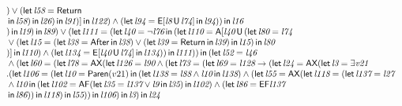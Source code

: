 \documentclass{article}
\newcommand{\U}{\,\mbox{\sf{U}}\,}
\newcommand{\A}{\mbox{\sf{A}}}
\newcommand{\E}{\mbox{\sf{E}}}
\newcommand{\AX}{\mbox{\sf{AX}}}
\newcommand{\AF}{\mbox{\sf{AF}}}
\newcommand{\EF}{\mbox{\sf{EF}}}
\newcommand{\mita}[1]{\mbox{\it{{#1}}}}
\newcommand{\msf}[1]{\mbox{\sf{{#1}}}}
\begin{document}
\[\begin{array}{l}
) \vee (\mita{\sf{let}} \, \mita{l58} = \msf{Return}\\\mbox{} \, \mita{\sf{in}} \, \mita{l58}
) \, \mita{\sf{in}} \, \mita{l26}
) \, \mita{\sf{in}} \, \mita{l91}
)]
 \, \mita{\sf{in}} \, \mita{l122}
) \wedge (\mita{\sf{let}} \, \mita{l94} = \E[\mita{l8} \U \mita{l74}]
 \, \mita{\sf{in}} \, \mita{l94}
)
) \, \mita{\sf{in}} \, \mita{l16}\\\mbox{}
) \, \mita{\sf{in}} \, \mita{l19}
) \, \mita{\sf{in}} \, \mita{l89}
) \vee (\mita{\sf{let}} \, \mita{l111} = (\mita{\sf{let}} \, \mita{l40} = \neg \mita{l76} \, \mita{\sf{in}} \, (\mita{\sf{let}} \, \mita{l110} = \A[\mita{l40} \U (\mita{\sf{let}} \, \mita{l80} = \mita{l74}\\\mbox{} \vee (\mita{\sf{let}} \, \mita{l15} = (\mita{\sf{let}} \, \mita{l38} = \msf{After} \, \mita{\sf{in}} \, \mita{l38}
) \vee (\mita{\sf{let}} \, \mita{l39} = \msf{Return} \, \mita{\sf{in}} \, \mita{l39}
) \, \mita{\sf{in}} \, \mita{l15}
) \, \mita{\sf{in}} \, \mita{l80}\\\mbox{}
)]
 \, \mita{\sf{in}} \, \mita{l110}
) \wedge (\mita{\sf{let}} \, \mita{l134} = \E[\mita{l40} \U \mita{l74}]
 \, \mita{\sf{in}} \, \mita{l134}
)
) \, \mita{\sf{in}} \, \mita{l111}
)
) \, \mita{\sf{in}} \, (\mita{\sf{let}} \, \mita{l52} = \mita{l46}\\\mbox{} \wedge (\mita{\sf{let}} \, \mita{l60} = (\mita{\sf{let}} \, \mita{l78} = \AX(\mita{\sf{let}} \, \mita{l126} = \mita{l90} \wedge (\mita{\sf{let}} \, \mita{l73} = (\mita{\sf{let}} \, \mita{l69} = \mita{l128} \rightarrow (\mita{\sf{let}} \, \mita{l24} = \AX(\mita{\sf{let}} \, \mita{l3} = \exists \mita{v21}\\\mbox{} . (\mita{\sf{let}} \, \mita{l106} = (\mita{\sf{let}} \, \mita{l10} = \msf{Paren}(v21) \, \mita{\sf{in}} \, (\mita{\sf{let}} \, \mita{l138} = \mita{l88} \wedge \mita{l10} \, \mita{\sf{in}} \, \mita{l138}
) \wedge (\mita{\sf{let}} \, \mita{l55} = \AX(\mita{\sf{let}} \, \mita{l118} = (\mita{\sf{let}} \, \mita{l137} = \mita{l27}\\\mbox{} \wedge \mita{l10} \, \mita{\sf{in}} \, (\mita{\sf{let}} \, \mita{l102} = \AF(\mita{\sf{let}} \, \mita{l35} = \mita{l137} \vee \mita{l9} \, \mita{\sf{in}} \, \mita{l35}
) \, \mita{\sf{in}} \, \mita{l102}
) \wedge (\mita{\sf{let}} \, \mita{l86} = \EF\mita{l137}\\\mbox{} \, \mita{\sf{in}} \, \mita{l86}
)
) \, \mita{\sf{in}} \, \mita{l118}
) \, \mita{\sf{in}} \, \mita{l55}
)
) \, \mita{\sf{in}} \, \mita{l106}
) \, \mita{\sf{in}} \, \mita{l3}
) \, \mita{\sf{in}} \, \mita{l24}

\end{array}\]
\end{document}
